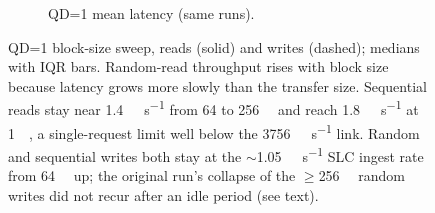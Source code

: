 \begin{figure}[!htbp]
{\begin{subfigure}[t]{0.49\linewidth}
      \caption{QD=1 mean latency (same runs).}
    \end{subfigure}%
  }
  \caption{QD=1 block-size sweep, reads (solid) and writes (dashed); medians with IQR bars. Random-read
  throughput rises with block size because latency grows more slowly than the transfer size. Sequential
  reads stay near \qty{1.4}{\gibi\byte\per\second} from 64 to \qty{256}{\kibi\byte} and reach
  \qty{1.8}{\gibi\byte\per\second} at \qty{1}{\mebi\byte}, a single-request limit well below the
  \qty{3756}{\mebi\byte\per\second} link. Random and sequential writes both stay at the
  \ensuremath{\sim}\qty{1.05}{\gibi\byte\per\second} SLC ingest rate from \qty{64}{\kibi\byte} up; the
  original run's collapse of the $\geq$\qty{256}{\kibi\byte} random writes did not recur after an
  idle period (see text). }\label{fig:block-size}
\end{figure}

